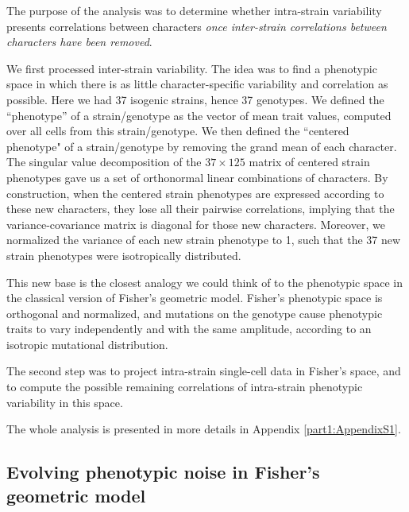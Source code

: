 The purpose of the analysis was to determine whether intra-strain variability presents correlations between characters \textit{once inter-strain correlations  between characters have been removed}. 

We first processed inter-strain variability. The idea was to find a phenotypic space in which there is as little character-specific variability and correlation as possible. Here we had 37 isogenic strains, hence 37 genotypes. We defined the ``phenotype'' of a strain/genotype as the vector of mean trait values, computed over all cells from this strain/genotype. We then defined the ``centered phenotype" of a strain/genotype by removing the grand mean of each character. The singular value decomposition of the $37\times125$ matrix of centered strain phenotypes gave us a set of orthonormal linear combinations of characters. By construction, when the centered strain phenotypes are expressed according to these new characters, they lose all their pairwise correlations, implying that the variance-covariance matrix is diagonal for those new characters. Moreover, we normalized the variance of each new strain phenotype to 1, such that the 37 new strain phenotypes were isotropically distributed.

This new base is the closest analogy we could think of to the phenotypic space in the classical version of Fisher's geometric model. Fisher's phenotypic space is orthogonal and normalized, and mutations on the genotype cause phenotypic traits to vary independently and with the same amplitude, according to an isotropic mutational distribution.

The second step was to project intra-strain single-cell data in Fisher's space, and to compute the possible remaining correlations of intra-strain phenotypic variability in this space.

The whole analysis is presented in more details in Appendix \ref{part1:AppendixS1}. 


\subsection{Evolving phenotypic noise in Fisher's geometric model}



